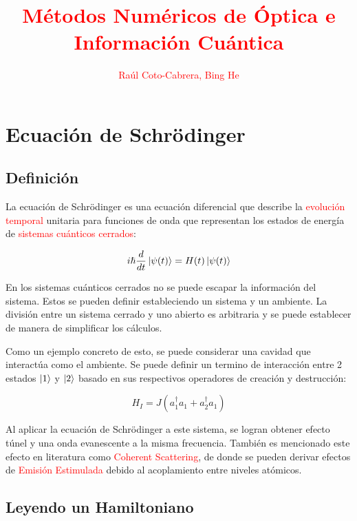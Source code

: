 \documentclass{book}
\begin{document}
\author{\textcolor{red}{Raúl Coto-Cabrera, Bing He}}
\title{\textcolor{red}{Métodos Numéricos de Óptica e Información Cuántica}}
\vspace{0.05in}
\everymath{\color{blue}}
\everydisplay{\color{blue}}
\maketitle
\tableofcontents
\chapter{Ecuación de Schr\"odinger}
\section{Definición}
La ecuación de Schr\"odinger es una ecuación diferencial que describe la \textcolor{red}{evolución temporal} unitaria para funciones de onda que representan los estados de energía de \textcolor{red}{sistemas cuánticos cerrados}:

\begin{equation}\label{eq1.1}i\hslash\frac{d}{dt}\ket{\psi(t)}=H(t)\ket{\psi(t)}\end{equation}

En los sistemas cuánticos cerrados no se puede escapar la información del sistema. Estos se pueden definir estableciendo un sistema y un ambiente. La división entre un sistema cerrado y uno abierto es arbitraria y se puede establecer de manera de simplificar los cálculos.

Como un ejemplo concreto de esto, se puede considerar una cavidad que interactúa como el ambiente. Se puede definir un termino de interacción entre 2 estados $\ket{1}$ y $\ket{2}$ basado en sus respectivos operadores de creación y destrucción:

\begin{equation}\label{eq1.2}H_{I}=J(a_1^\dag a_1+a_2^\dag a_1)\end{equation}

Al aplicar la ecuación de Schr\"odinger a este sistema, se logran obtener efecto túnel y una onda evanescente a la misma frecuencia. También es mencionado este efecto en literatura como \textcolor{red}{Coherent Scattering}, de donde se pueden derivar efectos de \textcolor{red}{Emisión Estimulada} debido al acoplamiento entre niveles atómicos.

\section{Leyendo un Hamiltoniano}
\end{document}
